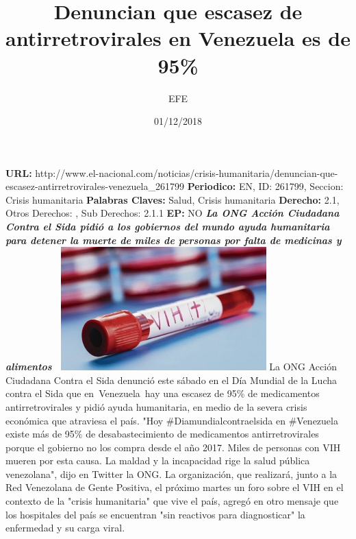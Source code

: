 \documentclass{article}%
\title{\textbf{Denuncian que escasez de antirretrovirales en Venezuela es de 95\%}}%
\author{EFE}%
\date{01/12/2018}%
\begin{document}
%
\normalsize%
\maketitle%
\textbf{URL: }%
http://www.el{-}nacional.com/noticias/crisis{-}humanitaria/denuncian{-}que{-}escasez{-}antirretrovirales{-}venezuela\_261799\newline%
%
\textbf{Periodico: }%
EN, %
ID: %
261799, %
Seccion: %
Crisis humanitaria\newline%
%
\textbf{Palabras Claves: }%
Salud, Crisis humanitaria\newline%
%
\textbf{Derecho: }%
2.1, %
Otros Derechos: %
, %
Sub Derechos: %
2.1.1\newline%
%
\textbf{EP: }%
NO\newline%
\newline%
%
\textbf{\textit{La ONG Acción Ciudadana Contra el Sida pidió a los gobiernos del mundo ayuda humanitaria para detener la muerte de miles de personas por falta de medicinas y alimentos~}}%
\newline%
\newline%
%
\includegraphics[width=300px]{24.jpg}%
\newline%
%
La ONG Acción Ciudadana Contra el Sida denunció este sábado en el Día Mundial de la Lucha contra el Sida que en~Venezuela~hay una escasez de 95\% de medicamentos antirretrovirales y pidió ayuda humanitaria, en medio de la severa crisis económica que atraviesa el país.%
\newline%
%
"Hoy \#Diamundialcontraelsida en \#Venezuela existe más de 95\% de desabastecimiento de medicamentos antirretrovirales porque el gobierno no los compra desde el año 2017. Miles de personas con VIH mueren por esta causa. La maldad y la incapacidad rige la salud pública venezolana", dijo en Twitter la ONG.%
\newline%
%
La organización, que realizará, junto a la Red Venezolana de Gente Positiva, el próximo martes un foro sobre el VIH en el contexto de la "crisis humanitaria" que vive el país, agregó en otro mensaje que los hospitales del país se encuentran "sin reactivos para diagnosticar" la enfermedad y su carga viral.%
\end{document}
